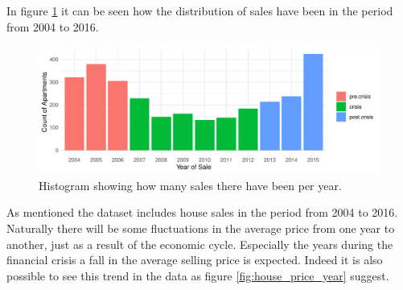 In figure \ref{fig:year_of_sale_histogram} it can be seen how the distribution of sales have been in the period from 2004 to 2016.
\begin{figure}[H]
    \centering
    \includegraphics[width = 0.8 \textwidth]{figures/Data_introduction/year_of_sale_histogram.pdf}
    \caption{Histogram showing how many sales there have been per year.}
    \label{fig:year_of_sale_histogram}
\end{figure}
As mentioned the dataset includes house sales in the period from 2004 to 2016.
Naturally there will be some fluctuations in the average price from one year to another, just as a result of the economic cycle.
Especially the years during the financial crisis a fall in the average selling price is expected.
Indeed it is also possible to see this trend in the data as figure \ref{fig:house_price_year} suggest.


